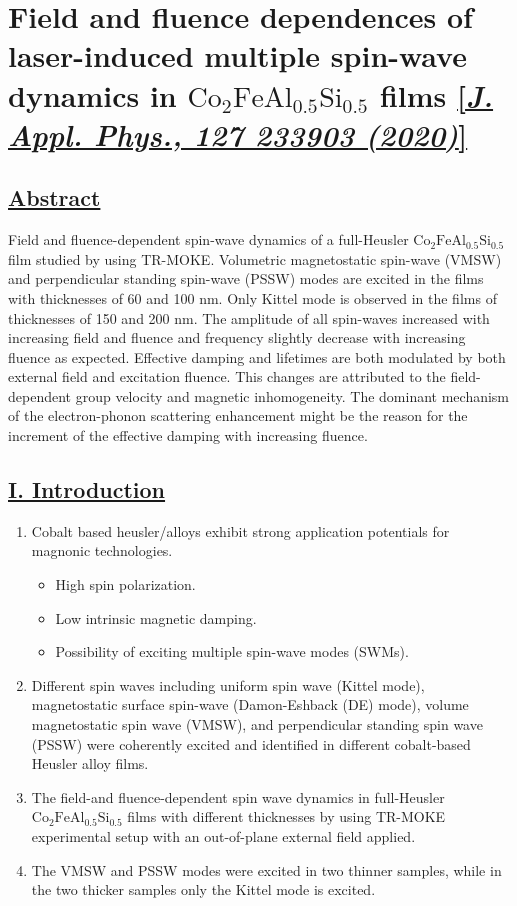 \section{Field and fluence dependences of laser-induced multiple spin-wave dynamics in $\mathrm{Co_2FeAl_{0.5}Si_{0.5}}$ films \href{https://doi.org/10.1063/5.0006321}{[\textit{J. Appl. Phys., 127 233903 (2020)}]}}


\subsection*{\underline{Abstract}}
Field and fluence-dependent spin-wave dynamics of a full-Heusler $\mathrm{Co_2FeAl_{0.5}Si_{0.5}}$ film studied by using TR-MOKE. Volumetric magnetostatic spin-wave (VMSW) and perpendicular standing spin-wave (PSSW) modes are excited in the films with thicknesses of 60 and 100 nm. Only Kittel mode is observed in the films of thicknesses of 150 and 200 nm. The amplitude of all spin-waves increased with increasing field and fluence and frequency slightly decrease with increasing fluence as expected. Effective damping and lifetimes are both modulated by both external field and excitation fluence. This changes are attributed to the field-dependent group velocity and magnetic inhomogeneity. The dominant mechanism of the electron-phonon scattering enhancement might be the reason for the increment of the effective damping with increasing fluence.

\subsection*{\underline{I. Introduction}}
\begin{enumerate}
    \item Cobalt based heusler/alloys exhibit strong application potentials for magnonic technologies.
    \begin{itemize}
        \item High spin polarization.
        \item Low intrinsic magnetic damping.
        \item Possibility of exciting multiple spin-wave modes (SWMs).
    \end{itemize}
    \item Different spin waves including uniform spin wave (Kittel mode), magnetostatic surface spin-wave (Damon-Eshback (DE) mode), volume magnetostatic spin wave (VMSW), and perpendicular standing spin wave (PSSW) were coherently excited and identified in different cobalt-based Heusler alloy films.
    \item The field-and fluence-dependent spin wave dynamics in full-Heusler $\mathrm{Co_2FeAl_{0.5}Si_{0.5}}$ films with different thicknesses by using TR-MOKE experimental setup with an out-of-plane external field applied.
    \item The VMSW and PSSW modes were excited in two thinner samples, while in the two thicker samples only the Kittel mode is excited.
\end{enumerate}

